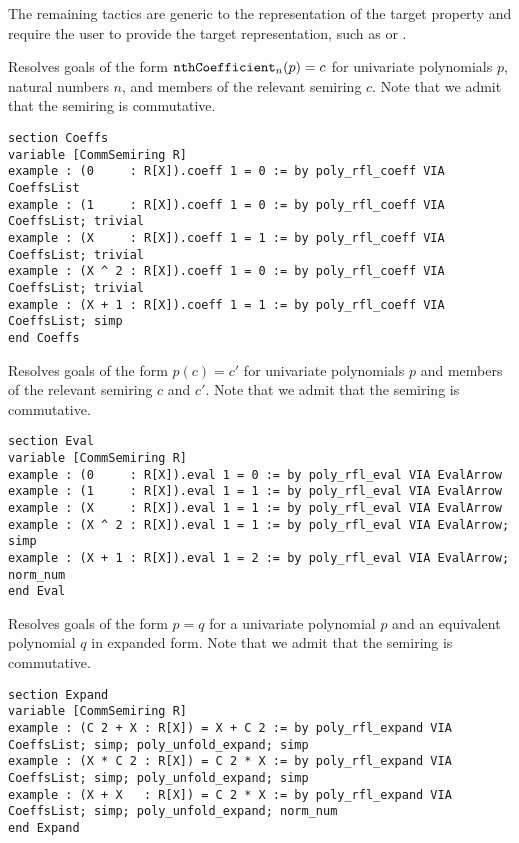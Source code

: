 The remaining tactics are generic to the representation of the target property and require the user to provide the target representation, such as  or .

\begin{tactic}
\label{tac:poly_rfl_coeff}
\leanok
{}
Resolves goals of the form $\mathtt{nthCoefficient}_n(p) = c$ for univariate polynomials $p$, natural numbers $n$, and members of the relevant semiring $c$. Note that we admit that the semiring is commutative.
\begin{lstlisting}
section Coeffs
variable [CommSemiring R]
example : (0     : R[X]).coeff 1 = 0 := by poly_rfl_coeff VIA CoeffsList
example : (1     : R[X]).coeff 1 = 0 := by poly_rfl_coeff VIA CoeffsList; trivial
example : (X     : R[X]).coeff 1 = 1 := by poly_rfl_coeff VIA CoeffsList; trivial
example : (X ^ 2 : R[X]).coeff 1 = 0 := by poly_rfl_coeff VIA CoeffsList; trivial
example : (X + 1 : R[X]).coeff 1 = 1 := by poly_rfl_coeff VIA CoeffsList; simp
end Coeffs
\end{lstlisting}
\end{tactic}

\begin{tactic}
\label{tac:poly_rfl_eval}
\leanok
{}
Resolves goals of the form $p(c) = c'$ for univariate polynomials $p$ and members of the relevant semiring $c$ and $c'$. Note that we admit that the semiring is commutative.
\begin{lstlisting}
section Eval
variable [CommSemiring R]
example : (0     : R[X]).eval 1 = 0 := by poly_rfl_eval VIA EvalArrow
example : (1     : R[X]).eval 1 = 1 := by poly_rfl_eval VIA EvalArrow
example : (X     : R[X]).eval 1 = 1 := by poly_rfl_eval VIA EvalArrow
example : (X ^ 2 : R[X]).eval 1 = 1 := by poly_rfl_eval VIA EvalArrow; simp
example : (X + 1 : R[X]).eval 1 = 2 := by poly_rfl_eval VIA EvalArrow; norm_num
end Eval
\end{lstlisting}
\end{tactic}

\begin{tactic}
\label{tac:poly_rfl_expand}
\leanok
{}
Resolves goals of the form $p = q$ for a univariate polynomial $p$ and an equivalent polynomial $q$ in expanded form. Note that we admit that the semiring is commutative.
\begin{lstlisting}
section Expand
variable [CommSemiring R]
example : (C 2 + X : R[X]) = X + C 2 := by poly_rfl_expand VIA CoeffsList; simp; poly_unfold_expand; simp
example : (X * C 2 : R[X]) = C 2 * X := by poly_rfl_expand VIA CoeffsList; simp; poly_unfold_expand; simp
example : (X + X   : R[X]) = C 2 * X := by poly_rfl_expand VIA CoeffsList; simp; poly_unfold_expand; norm_num
end Expand
\end{lstlisting}
\end{tactic}


